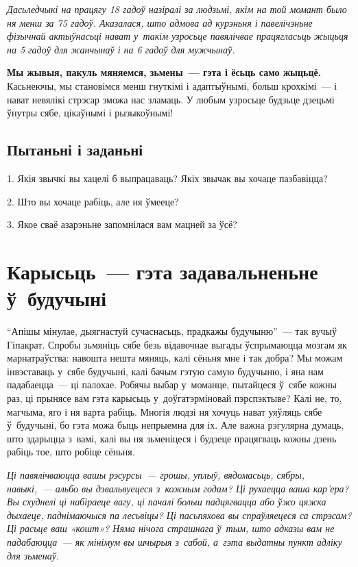 \emph{Дасьледчыкі на працягу 18 гадоў назіралі за людзьмі, якім на той момант было ня менш за 75 гадоў. Аказалася, што адмова ад курэньня і павелічэньне фізычнай актыўнасьці нават у~такім узросьце павялічвае працягласьць жыцьця на 5 гадоў для жанчынаў і на 6 гадоў для мужчынаў.}

\textbf{Мы жывыя, пакуль мяняемся, зьмены~--- гэта і ёсьць само жыцьцё.} Касьнеючы, мы становімся менш гнуткімі і адаптыўнымі, больш крохкімі~--- і нават невялікі стрэсар зможа нас зламаць. У любым узросьце будзьце дзецьмі ўнутры сябе, цікаўнымі і рызыкоўнымі!

\subsection*{Пытаньні і заданьні}

1. Якія звычкі вы хацелі б выпрацаваць? Якіх звычак вы хочаце пазбавіцца?

2. Што вы хочаце рабіць, але ня ўмееце?

3. Якое сваё азарэньне запомнілася вам мацней за ўсё?


\section{Карысьць~--- гэта задавальненьне ў~будучыні}

``Апішы мінулае, дыягнастуй сучаснасьць, прадкажы будучыню''~--- так вучыў Гіпакрат. Спробы зьмяніць сябе безь відавочнае выгады ўспрымаюцца мозгам як марнатраўства: навошта нешта мяняць, калі сёньня мне і так добра? Мы можам інвэставаць у~сябе будучыні, калі бачым гэтую самую будучыню, і яна нам падабаецца~--- ці палохае. Робячы выбар у~моманце, пытайцеся ў~сябе кожны раз, ці прынясе вам гэта карысьць у~доўгатэрміновай пэрспэктыве? Калі не, то, магчыма, яго і ня варта рабіць. Многія людзі ня хочуць нават уяўляць сябе ў~будучыні, бо гэта можа быць непрыемна для іх. Але важна рэгулярна думаць, што здарыцца з~вамі, калі вы ня зьменіцеся і будзеце працягваць кожны дзень рабіць тое, што робіце сёньня.

\emph{Ці павялічваюцца вашы рэсурсы~--- грошы, уплыў, вядомасьць, сябры, навыкі,~--- альбо вы дэвальвуецеся з~кожным годам? Ці рухаецца ваша кар'ера? Вы схуднелі ці набіраеце вагу, ці пачалі больш падцягвацца або ўжо цяжка дыхаеце, паднімаючыся па лесьвіцы? Ці пасьпяхова вы спраўляецеся са стрэсам? Ці расьце ваш «кошт»? Няма нічога страшнага ў~тым, што адказы вам не падабаюцца~--- як мінімум вы шчырыя з~сабой, а~гэта выдатны пункт адліку для зьменаў.}

